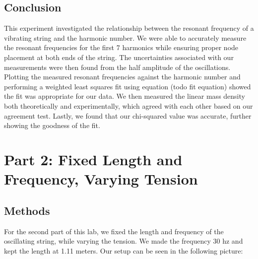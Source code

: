\documentclass[11pt]{article}
\let\oldsection\section
\renewcommand\section{\clearpage\oldsection}
\begin{document}
    
    \subsection{Conclusion}\label{subsec:part_1_conclusion}
    This experiment investigated the relationship between the resonant frequency of a vibrating string and the harmonic number. We were able to accurately measure the resonant frequencies for the first 7 harmonics while ensuring proper node placement at both ends of the string. The uncertainties associated with our measurements were then found from the half amplitude of the oscillations. Plotting the measured resonant frequencies against the harmonic number and performing a weighted least squares fit using equation (todo fit equation) showed the fit was appropriate for our data. We then measured the linear mass density both theoretically and experimentally, which agreed with each other based on our agreement test. Lastly, we found that our chi-squared value was accurate, further showing the goodness of the fit.

    
    \section{Part 2: Fixed Length and Frequency, Varying Tension }\label{sec:part_2}


    \subsection{Methods}\label{subsec:part_2_methods}

    For the second part of this lab, we fixed the length and frequency of the oscillating string, while varying the tension.
    We made the frequency 30 hz and kept the length at 1.11 meters.
    Our setup can be seen in the following picture:
\end{document}
